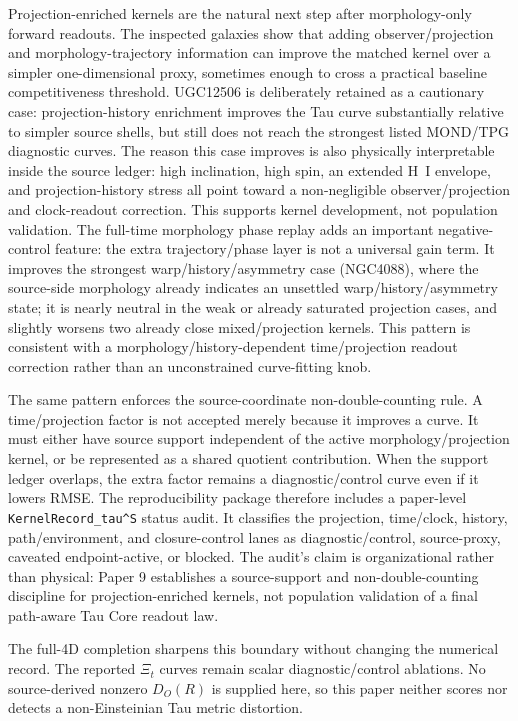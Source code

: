 \documentclass[11pt]{article}
\begin{document}
Projection-enriched kernels are the natural next step after morphology-only
forward readouts.  The inspected galaxies show that adding observer/projection
and morphology-trajectory information can improve the matched kernel over a
simpler one-dimensional proxy, sometimes enough to cross a practical baseline
competitiveness threshold.  UGC12506 is deliberately retained as a cautionary
case: projection-history enrichment improves the Tau curve substantially
relative to simpler source shells, but still does not reach the strongest
listed MOND/TPG diagnostic curves.  The reason this case improves is also
physically interpretable inside the source ledger: high inclination, high spin,
an extended H~I envelope, and projection-history stress all point toward a
non-negligible observer/projection and clock-readout correction.  This supports
kernel development, not population validation.  The full-time morphology phase
replay adds an
important negative-control feature: the extra trajectory/phase layer is not a
universal gain term.  It improves the strongest warp/history/asymmetry case
(NGC4088), where the source-side morphology already indicates an unsettled
warp/history/asymmetry state; it is nearly neutral in the weak or already
saturated projection cases, and slightly worsens two already close
mixed/projection kernels.  This pattern is consistent with a
morphology/history-dependent time/projection readout correction rather than an
unconstrained curve-fitting knob.

The same pattern enforces the source-coordinate non-double-counting rule.  A
time/projection factor is not accepted merely because it improves a curve.  It
must either have source support independent of the active morphology/projection
kernel, or be represented as a shared quotient contribution.  When the support
ledger overlaps, the extra factor remains a diagnostic/control curve even if it
lowers RMSE.
The reproducibility package therefore includes a paper-level
\texttt{KernelRecord\_tau\^{}S} status audit.  It classifies the projection, time/clock,
history, path/environment, and closure-control lanes as diagnostic/control,
source-proxy, caveated endpoint-active, or blocked.  The audit's claim is
organizational rather than physical: Paper 9 establishes a source-support and
non-double-counting discipline for projection-enriched kernels, not population
validation of a final path-aware Tau Core readout law.

The full-4D completion sharpens this boundary without changing the numerical
record.  The reported \(\Xi_t\) curves remain scalar diagnostic/control
ablations.  No source-derived nonzero \(D_O(R)\) is supplied here, so this
paper neither scores nor detects a non-Einsteinian Tau metric distortion.
\end{document}
